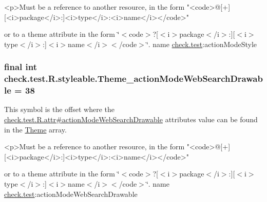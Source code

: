 \begin{DoxyVerb}      <p>Must be a reference to another resource, in the form "<code>@[+][<i>package</i>:]<i>type</i>:<i>name</i></code>"
\end{DoxyVerb}
 or to a theme attribute in the form \char`\"{}$<$code$>$?\mbox{[}$<$i$>$package$<$/i$>$\+:\mbox{]}\mbox{[}$<$i$>$type$<$/i$>$\+:\mbox{]}$<$i$>$name$<$/i$>$$<$/code$>$\char`\"{}.  name \hyperlink{namespacecheck_1_1test}{check.\+test}\+:action\+Mode\+Style \hypertarget{classcheck_1_1test_1_1_r_1_1styleable_aa5a92d7f473a39b7ff9ace293dc4d2d5}{}
\subsubsection[{Theme\+\_\+action\+Mode\+Web\+Search\+Drawable}]{\setlength{\rightskip}{0pt plus 5cm}final int check.\+test.\+R.\+styleable.\+Theme\+\_\+action\+Mode\+Web\+Search\+Drawable = 38\hspace{0.3cm}{\ttfamily [static]}}\label{classcheck_1_1test_1_1_r_1_1styleable_aa5a92d7f473a39b7ff9ace293dc4d2d5}
This symbol is the offset where the \hyperlink{classcheck_1_1test_1_1_r_1_1attr_afa8798d214b16417489dd4868015a948}{check.\+test.\+R.\+attr\#action\+Mode\+Web\+Search\+Drawable} attribute\textquotesingle{}s value can be found in the \hyperlink{classcheck_1_1test_1_1_r_1_1styleable_acca726d02016a0cf607782ec3a436a81}{Theme} array.

\begin{DoxyVerb}      <p>Must be a reference to another resource, in the form "<code>@[+][<i>package</i>:]<i>type</i>:<i>name</i></code>"
\end{DoxyVerb}
 or to a theme attribute in the form \char`\"{}$<$code$>$?\mbox{[}$<$i$>$package$<$/i$>$\+:\mbox{]}\mbox{[}$<$i$>$type$<$/i$>$\+:\mbox{]}$<$i$>$name$<$/i$>$$<$/code$>$\char`\"{}.  name \hyperlink{namespacecheck_1_1test}{check.\+test}\+:action\+Mode\+Web\+Search\+Drawable \hypertarget{classcheck_1_1test_1_1_r_1_1styleable_a43f29fc1f3579d42bcc1e4bbd4c853c6}{}
